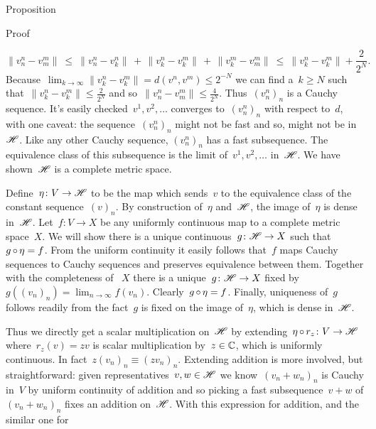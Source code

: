 \documentclass[b]{subfiles}
\begin{document}
\begin{parsec}
\begin{point}{Proposition}
\begin{point}{Proof}
\begin{point}
\begin{equation*}
    \| v^n_n - v^m_m \|
       \  \leq \ 
    \| v^n_n - v^n_k \| \,+\,
    \| v^n_k - v^m_k \| \,+\,
    \| v^m_k - v^m_m \|\  \leq \ 
    \| v^n_k - v^m_k \|+ \frac{2}{2^N}.
\end{equation*}
Because~$\lim_{k\to\infty} \|v_k^n-v_k^m \| =d(v^n,v^m) \leq 2^{-N}$
    we can find a~$k \geq N$
    such that~$\| v^n_k - v^m_k \| \leq \frac{2}{2^N}$
    and so~$\|v^n_n - v^m_m\| \leq \frac{4}{2^N}$.
    Thus~$(v^n_n)_n$ is a Cauchy sequence.
It's easily checked~$v^1, v^2, \ldots$
converges to~$(v^n_n)_n$ with respect to~$d$,
with one caveat: the sequence~$(v^n_n)_n$ might not be fast
    and so, might not be in~$\mathscr{H}$.
Like any other Cauchy sequence, $(v^n_n)_n$
    has a fast subsequence.
The equivalence class
    of this subsequence is the limit of~$v^1, v^2, \ldots$ in~$\mathscr{H}$.
We have shown~$\mathscr{H}$ is a complete metric space.
\end{point}
\begin{point}[prop-hilbert-space-completion-extension]%
Define~$\eta\colon V \to \mathscr{H}$
    to be the map which sends~$v$ to the equivalence class of the
    constant sequence~$(v)_n$.
By construction of~$\eta$ and~$\mathscr{H}$,
    the image of~$\eta$ is dense in~$\mathscr{H}$.
Let~$f\colon V \to X$
    be any uniformly continuous map to a complete metric space~$X$.
We will show there is a unique continuous~$g\colon \mathscr{H} \to X$
    such that~$g \mathop{\circ} \eta = f$.
From the uniform continuity it easily follows
    that~$f$ maps Cauchy sequences to Cauchy sequences
    and preserves equivalence between them.
Together with the completeness of ~$X$
    there is a unique~$g\colon \mathscr{H} \to X$
    fixed by~$g((v_n)_n) = \lim_{n\to\infty}f(v_n)$.
Clearly~$g \mathop{\circ} \eta = f$.
Finally, uniqueness of~$g$ follows readily from
    the fact~$g$ is fixed on the image of~$\eta$,
    which is dense in~$\mathscr{H}$.
\end{point}
\begin{point}%
Thus we directly get a scalar multiplication
    on~$\mathscr{H}$ by extending~$\eta \mathop{\circ} r_z \colon V \to \mathscr{H}$
    where~$r_z(v) = zv$ is scalar multiplication by~$z \in \mathbb{C}$,
    which is uniformly continuous.
In fact~$z (v_n)_n \equiv (z v_n)_n$.
Extending addition is more involved, but straightforward:
    given representatives~$v,w \in \mathscr{H}$
    we know~$(v_n+w_n)_n$ is Cauchy in~$V$
    by uniform continuity of addition and so
    picking a fast subsequence~$v+w$ of $(v_n+w_n)_n$
        fixes an addition on~$\mathscr{H}$.
With this expression for addition, and the similar one for

\end{point}
\end{point}
\end{point}
\end{parsec}
\end{document}
